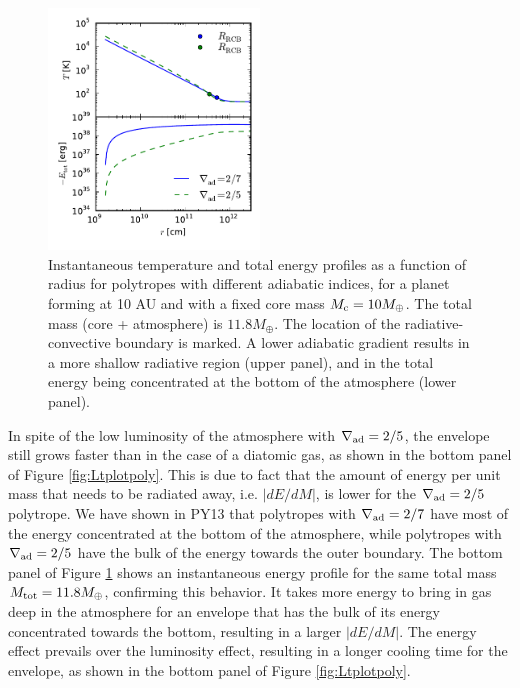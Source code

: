 \documentclass[apj]{emulateapj}
\newcommand{\delad}{\nabla_{\rm ad}}
\begin{document}
\begin{figure}[h]
\centering
\includegraphics[width=0.5\textwidth]{../../figs/ModelAtmospheres/RadSelfGravRealEOS/PaperFigs/TErplot_poly.pdf}
\caption{Instantaneous temperature and total energy profiles as a function of radius for polytropes with different adiabatic indices, for a planet forming at 10 AU and with a fixed core mass $M_{\rm c}=10 M_{\oplus}$. The total mass (core + atmosphere) is $11.8 M_{\oplus}$. The location of the radiative-convective boundary is marked. A lower adiabatic gradient results in a more shallow radiative region (upper panel), and in the total energy being concentrated at the bottom of the atmosphere (lower panel).}
\label{fig:ETrplotpoly}
\end{figure}

In spite of the low luminosity of the atmosphere with $\delad=2/5$, the envelope still grows faster than in the case of a diatomic gas, as shown in the bottom panel of Figure \ref{fig:Ltplotpoly}. This is due to fact that the amount of energy per unit mass that needs to be radiated away, i.e. $|dE/dM|$, is lower for the $\delad=2/5$ polytrope. We have shown in PY13 that polytropes with $\delad=2/7$ have most of the energy concentrated at the bottom of the atmosphere, while polytropes with $\delad=2/5$ have the bulk of the energy towards the outer boundary. The bottom panel of Figure \ref{fig:ETrplotpoly} shows an instantaneous energy profile for the same total mass $M_{\rm{tot}} = 11.8 M_{\oplus}$, confirming this behavior. It takes more energy to bring in gas deep in the atmosphere for an envelope that has the bulk of its energy concentrated towards the bottom,  resulting in a larger $|dE/dM|$. The energy effect prevails over the luminosity effect, resulting in a longer cooling time for the envelope, as shown in the bottom panel of Figure \ref{fig:Ltplotpoly}.
\end{document}
